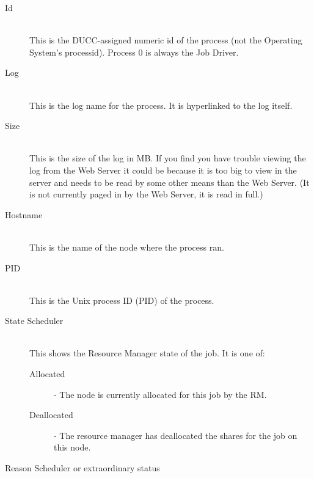     \begin{description}

        \item[Id] \hfill \\
          This is the DUCC-assigned numeric id of the process (not the Operating System's
          processid). Process 0 is always the Job Driver.          

        \item[Log] \hfill \\
          This is the log name for the process. It is hyperlinked to the log itself.

        \item[Size] \hfill \\
          This is the size of the log in MB. If you find you have trouble viewing the log
          from the Web Server it could be because it is too big to view in the server and needs to
          be read by some other means than the Web Server.  (It is not currently paged in by 
          the Web Server, it is read in full.)

        \item[Hostname] \hfill \\
          This is the name of the node where the process ran.

        \item[PID] \hfill \\
          This is the Unix process ID (PID) of the process.

        \item[State Scheduler] \hfill \\

          This shows the Resource Manager state of the job. It is one of:
          \begin{description}
              \item[Allocated] - The node is currently allocated for this job by the RM.
              \item[Deallocated] - The resource manager has deallocated the shares for the job on
                this node.
          \end{description}

        \item[Reason Scheduler or extraordinary status] \hfill \\
          \label{itm:job-details-sched}



\end{description}

